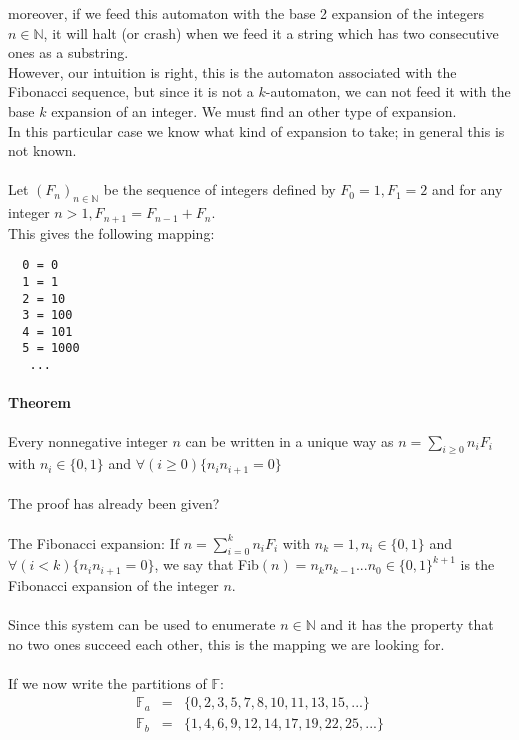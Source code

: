 \documentclass{article}
\begin{document}
moreover, if we feed this automaton with the base 2 expansion of the integers
$n \in \mathbb{N}$, it will halt (or crash) when we feed it a string which has
two consecutive ones as a substring.\\
However, our intuition is right, this is the automaton associated with the
Fibonacci sequence, but since it is not a $k$-automaton, we can not feed it 
with the base $k$ expansion of an integer. We must find an other type of 
expansion.\\
In this particular case we know what kind of expansion to take; in general this
is not known.\\
\\
Let $(F_n)_{n \in \mathbb{N}}$ be the sequence of integers defined by $F_0 = 1,
F_1 = 2$ and for any integer $n > 1, F_{n + 1} = F_{n - 1} + F_n$. \\
This gives the following mapping:
\begin{verbatim}
  0 = 0
  1 = 1
  2 = 10
  3 = 100
  4 = 101
  5 = 1000
   ...
\end{verbatim}

\paragraph{Theorem} 
Every nonnegative integer $n$ can be written in a unique way as
$n = \sum_{i \ge 0} n_i F_i$ with $n_i \in \{0, 1\}$ and 
$\forall (i \ge 0) \{n_i n_{i + 1} = 0\}$\\
\\
The proof has already been given?\\
\\
The Fibonacci expansion: If $n = \sum_{i = 0}^k n_i F_i$ with 
$n_k = 1, n_i \in \{0, 1\}$ and $\forall (i < k) \{n_i n_{i + 1} = 0\}$, we
say that Fib$(n) = n_k n_{k - 1} ... n_0 \in \{0, 1\}^{k + 1}$ is the 
Fibonacci expansion of the integer $n$.\\
\\
Since this system can be used to enumerate $n \in \mathbb{N}$ and it has the
property that no two ones succeed each other, this is the mapping we are 
looking for.\\
\\
If we now write the partitions of $\mathbb{F}$:
\begin{eqnarray*}
  \mathbb{F}_a &=& \{0, 2, 3, 5, 7, 8, 10, 11, 13, 15, ...\}\\
  \mathbb{F}_b &=& \{1, 4, 6, 9, 12, 14, 17, 19, 22, 25, ...\}
\end{eqnarray*}
\end{document}
